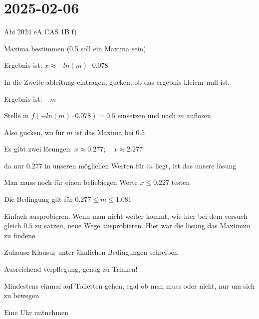 \section{2025-02-06}

\startframedtask
Abi 2024 eA CAS 1B f)
\stopframedtask

\startitemize[packed,m]
\item Maxima bestimmen (0.5 soll ein Maxima sein)

Ergebnis ist: $x\approx -ln(m) \cdot 0.078$
\item In die Zweite ableitung eintragen, gucken, ob das ergebnis kleienr null ist.

Ergebnis ist: $-m$
\item Stelle in $f(-ln(m) \cdot 0.078)=0.5$ einsetzen und nach $m$ auflösen

Also gucken, wo für $m$ ist das Maxima bei $0.5$
\item Es gibt zwei lösungen: $x\approx 0.277; \quad x\approx 2.277$
\item da nur $0.277$ in unseren möglichen Werten für $m$ liegt, ist das unsere lösung
\item Man muss noch für einen beliebiegen Werte $x\leq 0.227$ testen
\item Die Bedingung gilt für $0.277\leq m \leq 1.081$
\stopitemize

\startframedtipp
Einfach ausprobieren. Wenn man nicht weiter kommt, wie hier bei dem versuch
gleich $0.5$ zu sätzen, neue Wege ausprobieren. Hier war die lösung das Maximum
zu findene.
\stopframedtipp


\startframedtipp
\startitemize[packed,m]
\item Zuhause Klausur unter ähnlichen Bedingungen schreiben
\item Ausreichend verpflegung, genug zu Trinken!
\item Mindestens einmal auf Toiletten gehen, egal ob man muss oder nicht, nur um sich zu bewegen
\item Eine Uhr mitnehmen
\stopitemize
\stopframedtipp

